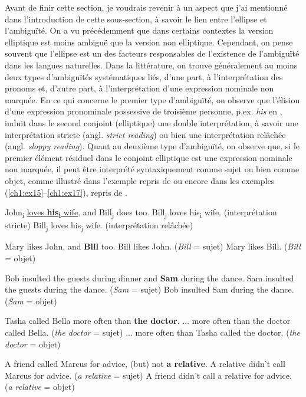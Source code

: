 Avant de finir cette section, je voudrais revenir à un aspect que j’ai mentionné dans l’introduction de cette sous-section, à savoir le lien entre l’ellipse et l’ambiguïté. On a vu précédemment que dans certains contextes la version elliptique est moins ambiguë que la version non elliptique. Cependant, on pense souvent que l’ellipse est un des facteurs responsables de l’existence de l’ambiguïté dans les langues naturelles. Dans la littérature, on trouve généralement au moins deux types d’ambiguïtés systématiques liés, d’une part, à l’interprétation des pronoms et, d’autre part, à l’interprétation d’une expression nominale non mar\-quée. En ce qui concerne le premier type d’ambiguïté, on observe que l’élision d’une expression pronominale possessive de troisième personne, p.ex. \textit{his} en , induit dans le second conjoint (elliptique) une double interprétation, à savoir une interprétation stricte (angl. \textit{strict reading}) ou bien une interprétation relâchée (angl. \textit{sloppy reading}). Quant au deuxième type d’ambiguïté, on observe que, si le premier élément résiduel dans le conjoint elliptique est une expression nominale non marquée, il peut être interprété syntaxiquement comme sujet ou bien comme objet, comme illustré dans l’exemple  repris de \citet{HendriksEtAl2005} ou encore dans les exemples (\ref{ch1:ex15}--\ref{ch1:ex17}), repris de \citet{CarlsonEtAl2005}.  

\ea	John\textsubscript{i} \uline{loves \textbf{his}\textbf{\textsubscript{i}} wife}, and Bill\textsubscript{j} does too. \label{ch1:ex13}
\ea  Bill\textsubscript{j} loves his\textsubscript{i} wife. (interprétation stricte)
\ex  Bill\textsubscript{j} loves his\textsubscript{j} wife. (interprétation relâchée)    
\z
\z

\ea	Mary likes John, and \textbf{Bill} too.\label{ch1:ex14}
\ea  Bill likes John. (\textit{Bill} = sujet)
\ex  Mary likes Bill. (\textit{Bill} = objet)
\z
\z

\ea	Bob insulted the guests during dinner and \textbf{Sam} during the dance.\label{ch1:ex15}
\ea  Sam insulted the guests during the dance. (\textit{Sam} = sujet) 
\ex  Bob insulted Sam during the dance. (\textit{Sam} = objet)
\z
\z

\ea Tasha called Bella more often than \textbf{the doctor}.
\ea  ... more often than the doctor called Bella. (\textit{the doctor} = sujet) 
\ex  ... more often than Tasha called the doctor. (\textit{the doctor} = objet)
\z
\z

\ea A friend called Marcus for advice, (but) not \textbf{a relative}.\label{ch1:ex17}
\ea  A relative didn’t call Marcus for advice. (\textit{a relative} = sujet) 
\ex  A friend didn’t call a relative for advice. (\textit{a relative} = objet)
\z
\z

